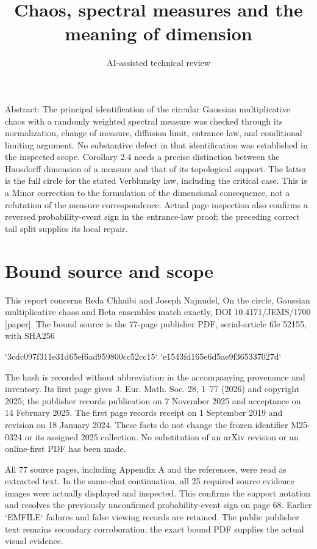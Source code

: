\documentclass[10pt]{article}
\title{Chaos, spectral measures and the meaning of dimension}
\author{AI-assisted technical review}
\date{}
\begin{document}
\maketitle
Abstract: The principal identification of the circular Gaussian multiplicative chaos with a randomly weighted spectral measure was checked through its normalization, change of measure, diffusion limit, entrance law, and conditional limiting argument. No substantive defect in that identification was established in the inspected scope. Corollary 2.4 needs a precise distinction between the Hausdorff dimension of a measure and that of its topological support. The latter is the full circle for the stated Verblunsky law, including the critical case. This is a Minor correction to the formulation of the dimensional consequence, not a refutation of the measure correspondence. Actual page inspection also confirms a reversed probability-event sign in the entrance-law proof; the preceding correct tail split supplies its local repair.\par
\section*{Bound source and scope}
This report concerns Reda Chhaibi and Joseph Najnudel, On the circle, Gaussian multiplicative chaos and Beta ensembles match exactly, DOI 10.4171/JEMS/1700 [paper]. The bound source is the 77-page publisher PDF, serial-article file 52155, with SHA256\par
`3cdc097f311e31d65ef6ad959800cc52cc15`
`e1543fd165e6d5ae9f365337027d`\par
The hash is recorded without abbreviation in the accompanying provenance and inventory. Its first page gives J. Eur. Math. Soc. 28, 1–77 (2026) and copyright 2025; the publisher records publication on 7 November 2025 and acceptance on 14 February 2025. The first page records receipt on 1 September 2019 and revision on 18 January 2024. These facts do not change the frozen identifier M25-0324 or its assigned 2025 collection. No substitution of an arXiv revision or an online-first PDF has been made.\par
All 77 source pages, including Appendix A and the references, were read as extracted text. In the same-chat continuation, all 25 required source evidence images were actually displayed and inspected. This confirms the support notation and resolves the previously unconfirmed probability-event sign on page 68. Earlier `EMFILE` failures and false viewing records are retained. The public publisher text remains secondary corroboration; the exact bound PDF supplies the actual visual evidence.\par
\end{document}
